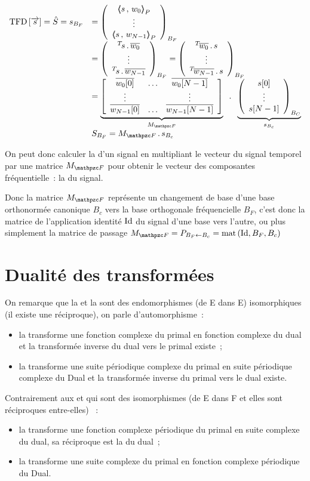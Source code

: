 \begin{equation}
  \label{eq:tfd_matrice}
  \begin{array}{ll}
    \mTFD\b{\vec{s}} = \hat{S}=s_{B_F}&=\vvvectBase{\scaldp{s}{w_0}}{\vdots}{\scaldp{s}{w_{N-1}}}{B_F}\\
                                      &= \vvvectBase{\Tr{s} \, .\, \conj{w_0}}{\vdots}{\Tr{s} \, .\, \conj{w_{N-1}}}{B_F} = \vvvectBase{\Tr{\conj{w_0}} \, .\, s}{\vdots}{\Tr{\conj{w_{N-1}}} \, .\, s}{B_F}  \\
                                      &=\caCest{\b{\mmmaaatrice{\conj{w_0[0]}}{\ldots}{\conj{w_0[N-1]}}{\vdots}{}{\vdots}{\conj{w_{N-1}[0]}}{\ldots}{\conj{w_{N-1}[N-1]}}}}{M_{\F}}\;\;.\;\; \caCest{\vvvectBase{s[0]}{\vdots}{s[N-1]}{B_C}}{s_{B_c}} \\
                                      &S_{B_F} = M_{\F}\,.\,s_{B_c} 
  \end{array}
\end{equation}

On peut donc calculer la \TFD{} d'un signal en multipliant le vecteur
du signal temporel par une matrice $M_{\F}$ pour obtenir le vecteur
des composantes fréquentielle~: la \TFD{} du signal.

Donc la matrice $M_{\F}$ représente un changement de base d'une base
orthonormée canonique $B_c$ vers la base orthogonale fréquencielle
$B_F$, c'est donc la matrice de l'application identité $\mathrm{Id}$ du signal
d'une base vers l'autre, ou plus simplement la matrice de passage
$M_{\F} = P_{B_F\leftarrow B_c} = \mat\p{\Id,B_F,B_c}$
\section{Dualité des transformées}
\label{sec:dualite}

On remarque que la \TF{} et la \TFD{} sont des endomorphismes (de E
dans E) isomorphiques (il existe une réciproque), on parle
d'automorphisme~:
\begin{itemize}
\item la \TF{} transforme une fonction complexe du primal en fonction
  complexe du dual et la transformée inverse du dual vers le primal
  existe~;
\item la \TFD{} transforme une suite périodique complexe du primal en
  suite périodique complexe du Dual et la transformée inverse du
  primal vers le dual existe.
\end{itemize}

Contrairement aux \sdf{} et \TFSD{} qui sont des isomorphismes (de E
dans F et elles sont réciproques entre-elles) ~:
\begin{itemize}
\item la \sdf{} transforme une fonction complexe périodique du primal
  en suite complexe du dual, sa réciproque est la \TFD{} du dual~;
\item la \TFSD{} transforme une suite complexe du primal en fonction
  complexe périodique du Dual.
\end{itemize}

